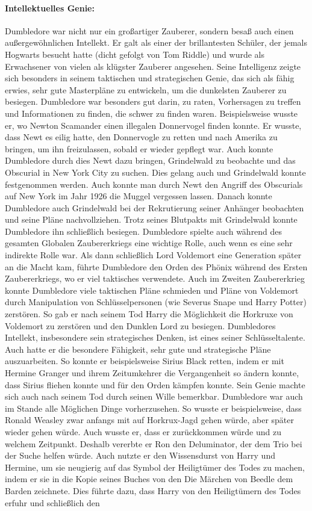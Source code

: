 \documentclass[a4paper, 10pt]{article}
\begin{document}
\paragraph{Intellektuelles Genie:}
Dumbledore war nicht nur ein großartiger Zauberer, sondern besaß auch einen außergewöhnlichen Intellekt. Er galt als einer der brillantesten Schüler, der jemals Hogwarts besucht hatte (dicht gefolgt von Tom Riddle) und wurde als Erwachsener von vielen als klügster Zauberer angesehen. Seine Intelligenz zeigte sich besonders in seinem taktischen und strategischen Genie, das sich als fähig erwies, sehr gute Masterpläne zu entwickeln, um die dunkelsten Zauberer zu besiegen. Dumbledore war besonders gut darin, zu raten, Vorhersagen zu treffen und Informationen zu finden, die schwer zu finden waren. Beispielsweise wusste er, wo Newton Scamander einen illegalen Donnervogel finden konnte. Er wusste, dass Newt es eilig hatte, den Donnervogle zu retten und nach Amerika zu bringen, um ihn freizulassen, sobald er wieder gepflegt war. Auch konnte Dumbledore durch dies Newt dazu bringen, Grindelwald zu beobachte und das Obscurial in New York City zu suchen. Dies gelang auch und Grindelwald konnte festgenommen werden. Auch konnte man durch Newt den Angriff des Obscurials auf New York im Jahr 1926 die Muggel vergessen lassen. Danach konnte Dumbledore auch Grindelwald bei der Rekrutierung seiner Anhänger beobachten und seine Pläne nachvollziehen. Trotz seines Blutpakts mit Grindelwald konnte Dumbledore ihn schließlich besiegen. Dumbledore spielte auch während des gesamten Globalen Zaubererkriegs eine wichtige Rolle, auch wenn es eine sehr indirekte Rolle war. Als dann schließlich Lord Voldemort eine Generation später an die Macht kam, führte Dumbledore den Orden des Phönix während des Ersten Zaubererkriegs, wo er viel taktisches verwendete. Auch im Zweiten Zaubererkrieg konnte Dumbledore viele taktischen Pläne schmieden und Pläne von Voldemort durch Manipulation von Schlüsselpersonen (wie Severus Snape und Harry Potter) zerstören. So gab er nach seinem Tod Harry die Möglichkeit die Horkruxe von Voldemort zu zerstören und den Dunklen Lord zu besiegen. Dumbledores Intellekt, insbesondere sein strategisches Denken, ist eines seiner Schlüsseltalente. Auch hatte er die besondere Fähigkeit, sehr gute und strategische Pläne auszuarbeiten. So konnte er beispielsweise Sirius Black retten, indem er mit Hermine Granger und ihrem Zeitumkehrer die Vergangenheit so ändern konnte, dass Sirius fliehen konnte und für den Orden kämpfen konnte. Sein Genie machte sich auch nach seinem Tod durch seinen Wille bemerkbar. Dumbledore war auch im Stande alle Möglichen Dinge vorherzusehen. So wusste er beispielsweise, dass Ronald Weasley zwar anfangs mit auf Horkrux-Jagd gehen würde, aber später wieder gehen würde. Auch wusste er, dass er zurückkommen würde und zu welchem Zeitpunkt. Deshalb vererbte er Ron den Deluminator, der dem Trio bei der Suche helfen würde. Auch nutzte er den Wissensdurst von Harry und Hermine, um sie neugierig auf das Symbol der Heiligtümer des Todes zu machen, indem er sie in die Kopie seines Buches von den Die Märchen von Beedle dem Barden zeichnete. Dies führte dazu, dass Harry von den Heiligtümern des Todes erfuhr und schließlich den 
\end{document}
